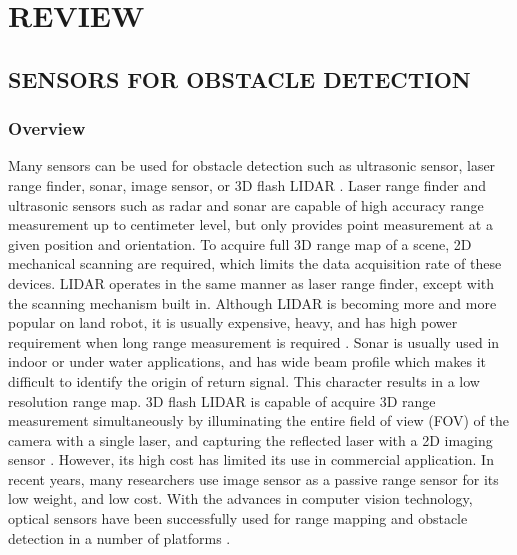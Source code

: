 \chapter{REVIEW}\label{ch:Review}

\section{SENSORS FOR OBSTACLE DETECTION}\label{sec:sensor}

\subsection{Overview}\label{sec:SensorOverview}
Many sensors can be used for obstacle detection such as ultrasonic
sensor, laser range finder, sonar, image sensor, or 3D flash LIDAR
\cite{de_angelis_low-cost_2007} \cite{alonge_novel_2009}
\cite{harb_neural_2008} \cite{saad_robust_2011}
\cite{williams_efficient_2001} \cite{chong_feature-based_1999}
\cite{hanna_obstacle_2008} \cite{lu_distance_2010}
\cite{civera_inverse_2008} \cite{jirawimut_visual_2003}
\cite{amzajerdian_lidar_2011}. Laser range finder and ultrasonic
sensors such as radar and sonar are capable of high accuracy range
measurement up to centimeter level, but only provides point
measurement at a given position and orientation. To acquire full 3D
range map of a scene, 2D mechanical scanning are required, which
limits the data acquisition rate of these devices. LIDAR operates in
the same manner as laser range finder, except with the scanning
mechanism built in. Although LIDAR is becoming more and more popular
on land robot, it is usually expensive, heavy,
\cite{subharsanan_low_2013} and has high power requirement when long
range measurement is required \cite{lemmens_airborne_2007}. Sonar is
usually used in indoor or under water applications, and has wide beam
profile which makes it difficult to identify the origin of return
signal. This character results in a low resolution range map. 3D flash
LIDAR is capable of acquire 3D range measurement simultaneously by
illuminating the entire field of view (FOV) of the camera with a
single laser, and capturing the reflected laser with a 2D imaging
sensor \cite{amzajerdian_lidar_2011}. However, its high cost has
limited its use in commercial application. In recent years, many
researchers use image sensor as a passive range sensor for its low
weight, and low cost. With the advances in computer vision technology,
optical sensors have been successfully used for range mapping and
obstacle detection in a number of platforms \cite{einhorn_cant_2010}
\cite{hashimoto_detection_1996} \cite{yamaguchi_moving_2006}
\cite{zhang_obstacle_2012} \cite{maier_self-supervised_2011}
\cite{kubota_global_2007} \cite{xu_method_2009}
\cite{hanna_obstacle_2008} \cite{zhang_real-time_2012}
\cite{van_der_mark_stereo_2007} \cite{broggi_stereo_2011}.


